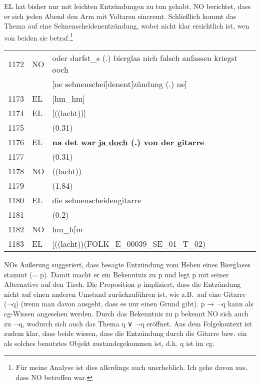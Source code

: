 EL hat bisher nur mit leichten Entzündungen zu tun gehabt, NO berichtet, dass er sich jeden Abend den Arm mit Voltaren eincremt. Schließlich kommt das Thema auf eine Sehnenscheidenentzündung, wobei nicht klar ersichtlich ist, wen von beiden sie betraf.\footnote{Für meine Analyse ist dies allerdings auch unerheblich. Ich gehe davon aus, dass NO betroffen war.}

\begin{exe}
	\ex\label{456} 
		\begin{tabular}[t]{@{}lll@{}} 
 		1172 & NO & oder darfst\_s (.) bierglas nich falsch anfassen kriegst ooch \tabularnewline
 		& & [ne sehnenschei]denent[zündung (.) ne] \tabularnewline
 		1173 & EL & [hm\_hm] \tabularnewline
 		1174 & EL & [((lacht))] \tabularnewline
 		1175 &	& (0.31) \tabularnewline
		1176 & EL &	\textbf{na det war \underline{ja doch} (.) von der gitarre} \tabularnewline
		1177 &	& (0.31) \tabularnewline
		1178 & NO & ((lacht)) \tabularnewline
 		1179 &	& (1.84) \tabularnewline
		1180 & EL & die sehnenscheidengitarre \tabularnewline
		1181 & & (0.2) \tabularnewline
		1182 & NO & hm\_h[m \tabularnewline
		1183 & EL & [((lacht))\hfill\hbox{\scshape(FOLK\_E\_00039\_SE\_01\_T\_02)}			
  		\end{tabular} 						
\end{exe}\largerpage
NOs Äußerung suggeriert, dass besagte Entzündung vom Heben eines Bierglases stammt (= p). Damit macht er ein Bekenntnis zu p und legt p mit seiner Alternative auf den Tisch. Die Proposition p  impliziert, dass die Entzündung nicht auf einen anderen Umstand zurückzuführen ist, wie z.B.\ auf eine Gitarre (¬q) (wenn man davon ausgeht, dass es nur einen Grund gibt). p → ¬q kann als cg-Wissen angesehen werden. Durch das Bekenntnis zu p bekennt NO sich auch zu ¬q, wodurch sich auch das Thema q ∨ ¬q eröffnet. Aus dem Folgekontext ist zudem klar, dass beide wissen, dass die Entzündung durch die Gitarre bzw. ein als solches benutztes Objekt zustandegekommen ist, d.h. q ist im cg.

